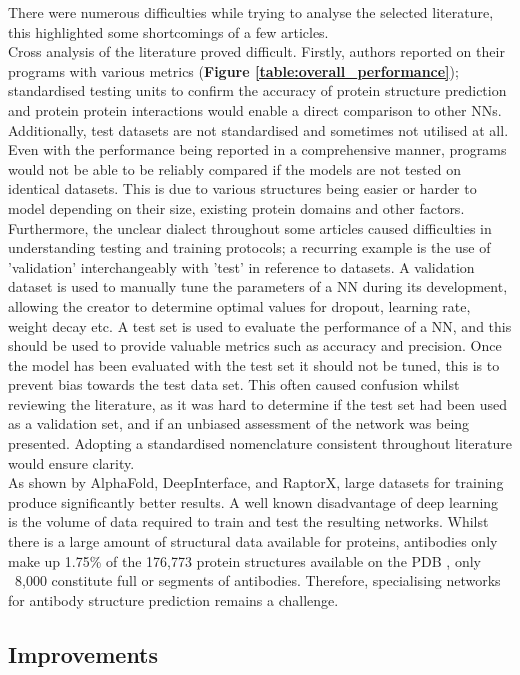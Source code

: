 There were numerous difficulties while trying to analyse the selected literature, this highlighted some shortcomings of a few articles.
\\[12pt]
Cross analysis of the literature proved difficult. Firstly, authors reported on their programs with various metrics (\textbf{Figure \ref{table:overall_performance}}); standardised testing units to confirm the accuracy of protein structure prediction and protein protein interactions would enable a direct comparison to other NNs. Additionally, test datasets are not standardised and sometimes not utilised at all. Even with the performance being reported in a comprehensive manner, programs would not be able to be reliably compared if the models are not tested on identical datasets. This is due to various structures being easier or harder to model depending on their size, existing protein domains and other factors. Furthermore, the unclear dialect throughout some articles caused difficulties in understanding testing and training protocols; a recurring example is the use of 'validation' interchangeably with 'test' in reference to datasets. A validation dataset is used to manually tune the parameters of a NN during its development, allowing the creator to determine optimal values for dropout, learning rate, weight decay etc. A test set is used to evaluate the performance of a NN, and this should be used to provide valuable metrics such as accuracy and precision. Once the model has been evaluated with the test set it should not be tuned, this is to prevent bias towards the test data set. This often caused confusion whilst reviewing the literature, as it was hard to determine if the test set had been used as a validation set, and if an unbiased assessment of the network was being presented. Adopting a standardised nomenclature consistent throughout literature would ensure clarity.
\\[12pt]
As shown by AlphaFold, DeepInterface, and RaptorX, large datasets for training produce significantly better results. A well known disadvantage of deep learning is the volume of data required to train and test the resulting networks. Whilst there is a large amount of structural data available for proteins, antibodies only make up 1.75\% of the 176,773 protein structures available on the PDB \cite{bermanProteinDataBank2000a}, only ~8,000 constitute full or segments of antibodies. Therefore, specialising networks for antibody structure prediction remains a challenge. 

\subsection{Improvements}

